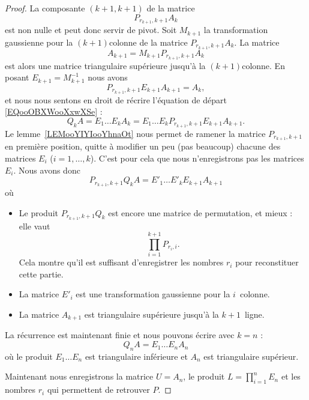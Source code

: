 \begin{proof}
	La composante \( (k+1,k+1)\) de la matrice
	\begin{equation}
		P_{r_{k+1},k+1}A_k
	\end{equation}
	est non nulle et peut donc servir de pivot. Soit \( M_{k+1}\) la transformation gaussienne pour la \( (k+1)\)\ieme colonne de la matrice \( P_{r_{k+1},k+1}A_k\). La matrice
	\begin{equation}        \label{EQooCFIFooNDvPFE}
		A_{k+1}=M_{k+1}P_{r_{k+1},k+1}A_k
	\end{equation}
	est alors une matrice triangulaire supérieure jusqu'à la \( (k+1)\)\ieme colonne. En posant \( E_{k+1}=M_{k+1}^{-1}\) nous avons
	\begin{equation}
		P_{r_{k+1},k+1}E_{k+1}A_{k+1}=A_k,
	\end{equation}
	et nous nous sentons en droit de récrire l'équation de départ \eqref{EQooOBXWooXxwXSe} :
	\begin{equation}
		Q_kA=E_1\ldots E_kA_k=E_1\ldots E_kP_{r_{k+1},k+1}E_{k+1}A_{k+1}.
	\end{equation}
	Le lemme~\ref{LEMooYIYIooYhnaOt} nous permet de ramener la matrice \( P_{r_{k+1},k+1}\) en première position, quitte à modifier un peu (pas beaucoup) chacune des matrices \( E_i\) (\( i=1,\ldots, k\)). C'est pour cela que nous n'enregistrons pas les matrices \( E_i\). Nous avons donc
	\begin{equation}
		P_{r_{k+1},k+1}Q_kA=E'_1\ldots E'_kE_{k+1}A_{k+1}
	\end{equation}
	où
	\begin{itemize}
		\item Le produit \( P_{r_{k+1},k+1}Q_k\) est encore une matrice de permutation, et mieux : elle vaut
		      \begin{equation}
			      \prod_{i=1}^{k+1}P_{r_i,i}.
		      \end{equation}
		      Cela montre qu'il est suffisant d'enregistrer les nombres \( r_i\) pour reconstituer cette partie.
		\item
		      La matrice \( E'_i\) est une transformation gaussienne pour la \( i\)\ieme\ colonne.
		\item
		      La matrice \( A_{k+1}\) est triangulaire supérieure jusqu'à la \( k+1\)\ieme\ ligne.
	\end{itemize}

	La récurrence est maintenant finie et nous pouvons écrire avec \( k=n\) :
	\begin{equation}        \label{EQooFUEUooHVPFwn}
		Q_nA=E_1\ldots E_nA_n
	\end{equation}
	où le produit \( E_1\ldots E_n\) est triangulaire inférieure et \( A_n\) est triangulaire supérieur.

	Maintenant nous enregistrons la matrice \( U=A_n\), le produit \( L=\prod_{i=1}^nE_n\) et les nombres \( r_i\) qui permettent de retrouver \( P\).
\end{proof}

